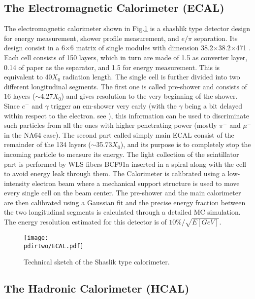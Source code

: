\subsection{The Electromagnetic Calorimeter (ECAL)}
\label{ch2:sec:detectors-ecal}

The electromagnetic calorimeter shown in Fig.\ref{fig:ecal-sketch} is a shashlik type detector design for energy measurement, shower profile measurement, and $e/\pi$ separation. Its design consist in a 6$\times$6 matrix of single modules with dimension 38.2$\times$38.2$\times$471 \mmc. Each cell consists of 150 layers, which in turn are made of 1.5 \mmi as converter layer, 0.14 \mmi of paper as the separator, and 1.5 \mmi for energy measurement. This is equivalent to 40$X_0$ radiation length. The single cell is further divided into two different longitudinal segments. The first one is called pre-shower and consists of 16 layers ($\sim$4.27$X_0$) and gives resolution to the very beginning of the shower. Since $e^-$ and $\gamma$ trigger an em-shower very early (with the $\gamma$ being a bit delayed within respect to the electron. see \cite{Bichsel:2002cf}), this information can be used to discriminate such particles from all the ones with higher penetrating power (mostly $\pi^-$ and $\mu^-$ in the NA64 case). The second part called simply main ECAL consist of the remainder of the 134 layers ($\sim$35.73$X_0$), and its purpose is to completely stop the incoming particle to measure its energy. The light collection of the scintillator part is performed by WLS fibers BCF91a \cite{wls-fibers} inserted in a spiral along with the cell to avoid energy leak through them. The Calorimeter is calibrated using a low-intensity electron beam where a mechanical support structure is used to move every single cell on the beam center. The pre-shower and the main calorimeter are then calibrated using a Gaussian fit and the precise energy fraction between the two longitudinal segments is calculated through a detailed MC simulation. The energy resolution estimated for this detector is of $10\% / \sqrt{E[GeV]}$.

\begin{figure}[bth!]
\centering
\texttt{[image: \\pdirtwo/ECAL.pdf]}
\caption[ECAL sketch]{Technical sketch of the Shaslik type calorimeter.}
\label{fig:ecal-sketch}
\end{figure}

\subsection{The Hadronic Calorimeter (HCAL)}
\label{ch2:sec:detectors-hcal}


